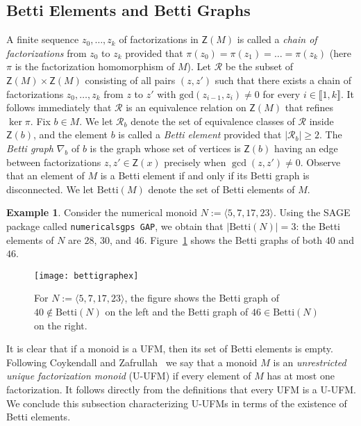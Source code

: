 \documentclass[12pt]{amsart}
\theoremstyle{definition}
\newtheorem{example}[theorem]{Example}
\numberwithin{equation}{section}
\newcommand{\nn}{\mathbb{N}}
\providecommand\ldb{\llbracket}
\providecommand\rdb{\rrbracket}
\begin{document}
\subsection{Betti Elements and Betti Graphs} A finite sequence $z_0, \dots, z_k$ of factorizations in $\mathsf{Z}(M)$ is called a \emph{chain of factorizations} from $z_0$ to $z_k$ provided that $\pi(z_0) = \pi(z_1) = \dots = \pi(z_k)$ (here $\pi$ is the factorization homomorphism of $M$). Let $\mathcal{R}$ be the subset of $\mathsf{Z}(M) \times \mathsf{Z}(M)$ consisting of all pairs $(z,z')$ such that there exists a chain of factorizations $z_0, \dots, z_k$ from $z$ to $z'$ with $\text{gcd}(z_{i-1}, z_i) \neq 0$ for every $i \in \ldb 1,k \rdb$. It follows immediately that $\mathcal{R}$ is an equivalence relation on $\mathsf{Z}(M)$ that refines $\ker \pi$. Fix $b \in M$. We let $\mathcal{R}_b$ denote the set of equivalence classes of $\mathcal{R}$ inside $\mathsf{Z}(b)$, and the element $b$ is called a \emph{Betti element} provided that $|\mathcal{R}_b| \ge 2$.  The \emph{Betti graph} $\nabla_b$ of $b$ is the graph whose set of vertices is $\mathsf{Z}(b)$ having an edge between factorizations $z,z' \in \mathsf{Z}(x)$ precisely when $\gcd(z,z') \neq 0$. Observe that an element of $M$ is a Betti element if and only if its Betti graph is disconnected. We let $\text{Betti}(M)$ denote the set of Betti elements of $M$. 

\begin{example}
	Consider the numerical monoid $N := \langle 5,7,17,23 \rangle$. Using the SAGE package called \texttt{numericalsgps GAP}, we obtain that $|\text{Betti}(N)| = 3$: the Betti elements of $N$ are $28$, $30$, and $46$. Figure~\ref{fig:factorization graphs} shows the Betti graphs of both $40$ and $46$.
	\begin{figure}[h]
		\centering
		\texttt{[image: bettigraphex]}
		\caption{For $N := \langle 5,7,17,23 \rangle$, the figure shows the Betti graph of $40 \notin \text{Betti}(N)$ on the left and the Betti graph of $46 \in \text{Betti}(N)$ on the right.}
		\label{fig:factorization graphs}
	\end{figure}
\end{example}

It is clear that if a monoid is a UFM, then its set of Betti elements is empty. Following Coykendall and Zafrullah~\cite{CZ04} we say that a monoid $M$ is an \emph{unrestricted unique factorization monoid} (U-UFM) if every element of $M$ has at most one factorization. It follows directly from the definitions that every UFM is a U-UFM. We conclude this subsection characterizing U-UFMs in terms of the existence of Betti elements.
\end{document}
